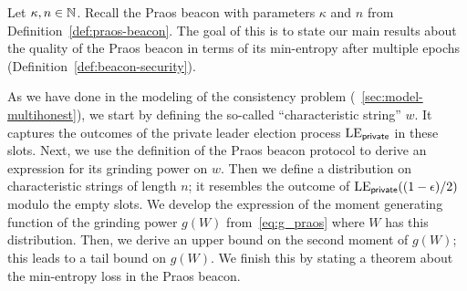

Let $\kappa, n \in \mathbb{N}$. 
Recall the Praos beacon with parameters $\kappa$ and $n$ from Definition~\ref{def:praos-beacon}. 
The goal of this \Section is to state our main results 
about the quality of the Praos beacon 
in terms of its min-entropy after multiple epochs (Definition~\ref{def:beacon-security}).

As we have done in the modeling of the consistency problem 
(\Section~\ref{sec:model-multihonest}), 
we start by defining the so-called ``characteristic string'' $w$. 
It captures the outcomes of the private leader election process $\mathrm{LE}_\mathsf{private}$ 
in these slots. 
Next, we use the definition of the Praos beacon protocol to 
derive an expression for its grinding power on $w$.
Then we define a distribution on characteristic strings of length $n$; 
it resembles the outcome of $\mathrm{LE}_\mathsf{private}((1-\epsilon)/2)$ 
modulo the empty slots. 
We develop the expression of the moment generating function of the 
grinding power $g(W)$ from~\eqref{eq:g_praos} 
where $W$ has this distribution. 
Then, we derive an upper bound on the second moment of $g(W)$;
this leads to a  tail bound on $g(W)$.
We finish this \Section by stating a theorem about the min-entropy loss in the Praos beacon. 





\newcommand{\Suffix}[2]{ \mathsf{suffix}({#1},{#2})}
\newcommand{\CoinTossingLC}{\Pi_\mathsf{lc}^{\Players(\alpha),k,n}}






